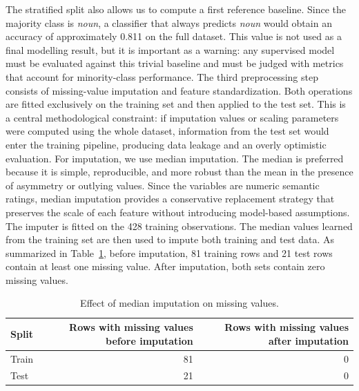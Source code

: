 \documentclass{ipgpmaster}
\begin{document}
The stratified split also allows us to compute a first reference baseline. Since the majority class is \emph{noun}, a classifier that always predicts \emph{noun} would obtain an accuracy of approximately 0.811 on the full dataset. This value is not used as a final modelling result, but it is important as a warning: any supervised model must be evaluated against this trivial baseline and must be judged with metrics that account for minority-class performance.
The third preprocessing step consists of missing-value imputation and feature standardization. Both operations are fitted exclusively on the training set and then applied to the test set. This is a central methodological constraint: if imputation values or scaling parameters were computed using the whole dataset, information from the test set would enter the training pipeline, producing data leakage and an overly optimistic evaluation\cite{james2013introduction}.
For imputation, we use median imputation. The median is preferred because it is simple, reproducible, and more robust than the mean in the presence of asymmetry or outlying values. Since the variables are numeric semantic ratings, median imputation provides a conservative replacement strategy that preserves the scale of each feature without introducing model-based assumptions. The imputer is fitted on the 428 training observations. The median values learned from the training set are then used to impute both training and test data. As summarized in Table~\ref{tab:imputation_effect}, before imputation, 81 training rows and 21 test rows contain at least one missing value. After imputation, both sets contain zero missing values.

\begin{table}[H]
\centering
\begin{tabular}{lrr}
\toprule
\textbf{Split} & \textbf{Rows with missing values before imputation} & \textbf{Rows with missing values after imputation} \\
\midrule
Train & 81 & 0 \\
Test & 21 & 0 \\
\bottomrule
\end{tabular}
\caption{Effect of median imputation on missing values.}
\label{tab:imputation_effect}
\end{table}
\end{document}
